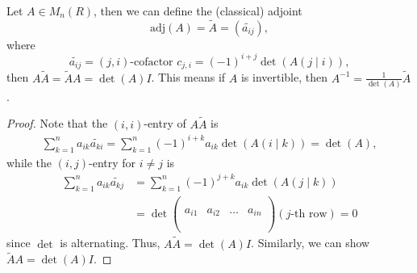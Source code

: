 \begin{theorem}
    Let \(A \in M_n(R)\), then we can define the (classical) adjoint 
    \[
        \mathrm{adj}(A) = \widetilde{A} = \left( \widetilde{a_{ij}}  \right) , 
    \] where 
    \[
        \widetilde{a_{ij} } = (j, i)\text{-cofactor } c_{j,i} = (-1)^{i+j} \det \left( A(j \mid i) \right),   
    \] then \(A \widetilde{A} = \widetilde{A} A = \det (A) I\). This means if \(A\) is invertible, then \(A^{-1} = \frac{1}{\det (A)} \widetilde{A} \).  
\end{theorem}
\begin{proof}
    Note that the \((i, i)\)-entry of \(A \widetilde{A} \) is 
    \begin{align*}
        \sum_{k=1}^n a_{ik} \widetilde{a_{ki}} = \sum_{k=1}^n (-1)^{i+k}a_{ik} \det (A(i \mid k)) = \det (A),   
    \end{align*}
    while the \((i, j)\)-entry for \(i \neq j\) is 
    \begin{align*}
        \sum_{k=1}^n a_{ik} \widetilde{a_{kj}} &= \sum_{k=1}^n (-1)^{j+k} a_{ik} \det \left( A(j \mid k) \right) \\
        &= \det \begin{pmatrix}
             &  &  &   \\
             &  &  &   \\
            a_{i1} & a_{i2} & \dots  & a_{in}  \\
             &  &  &    \\
             &  &  &   \\
        \end{pmatrix} (j\text{-th row}) = 0
    \end{align*}  
    since \(\det \) is alternating. Thus, \(A \widetilde{A} = \det (A) I\). Similarly, we can show \(\widetilde{A} A = \det (A) I\).  
\end{proof}


